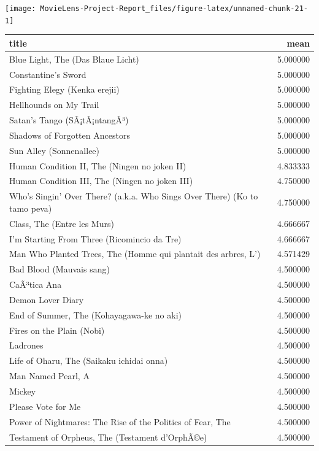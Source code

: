 \documentclass[
]{article}
\begin{document}
\begin{center}\texttt{[image: MovieLens-Project-Report\_files/figure-latex/unnamed-chunk-21-1]} \end{center}

\begin{table}[!h]
\centering\begingroup\fontsize{10}{12}\selectfont

\begin{tabular}{l|r}
\hline
title & mean\\
\hline
Blue Light, The (Das Blaue Licht) & 5.000000\\
\hline
Constantine's Sword & 5.000000\\
\hline
Fighting Elegy (Kenka erejii) & 5.000000\\
\hline
Hellhounds on My Trail & 5.000000\\
\hline
Satan's Tango (SÃ¡tÃ¡ntangÃ³) & 5.000000\\
\hline
Shadows of Forgotten Ancestors & 5.000000\\
\hline
Sun Alley (Sonnenallee) & 5.000000\\
\hline
Human Condition II, The (Ningen no joken II) & 4.833333\\
\hline
Human Condition III, The (Ningen no joken III) & 4.750000\\
\hline
Who's Singin' Over There? (a.k.a. Who Sings Over There) (Ko to tamo peva) & 4.750000\\
\hline
Class, The (Entre les Murs) & 4.666667\\
\hline
I'm Starting From Three (Ricomincio da Tre) & 4.666667\\
\hline
Man Who Planted Trees, The (Homme qui plantait des arbres, L') & 4.571429\\
\hline
Bad Blood (Mauvais sang) & 4.500000\\
\hline
CaÃ³tica Ana & 4.500000\\
\hline
Demon Lover Diary & 4.500000\\
\hline
End of Summer, The (Kohayagawa-ke no aki) & 4.500000\\
\hline
Fires on the Plain (Nobi) & 4.500000\\
\hline
Ladrones & 4.500000\\
\hline
Life of Oharu, The (Saikaku ichidai onna) & 4.500000\\
\hline
Man Named Pearl, A & 4.500000\\
\hline
Mickey & 4.500000\\
\hline
Please Vote for Me & 4.500000\\
\hline
Power of Nightmares: The Rise of the Politics of Fear, The & 4.500000\\
\hline
Testament of Orpheus, The (Testament d'OrphÃ©e) & 4.500000\\
\hline
\end{tabular}
\endgroup{}
\end{table}
\end{document}
